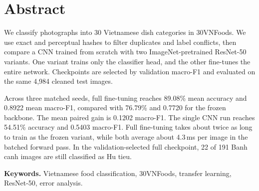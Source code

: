 \section*{Abstract}

We classify photographs into 30 Vietnamese dish categories in 30VNFoods. We use exact and perceptual hashes to filter duplicates and label conflicts, then compare a CNN trained from scratch with two ImageNet-pretrained ResNet-50 variants. One variant trains only the classifier head, and the other fine-tunes the entire network. Checkpoints are selected by validation macro-F1 and evaluated on the same 4,984 cleaned test images.

Across three matched seeds, full fine-tuning reaches 89.08\% mean accuracy and 0.8922 mean macro-F1, compared with 76.79\% and 0.7720 for the frozen backbone. The mean paired gain is 0.1202 macro-F1. The single CNN run reaches 54.51\% accuracy and 0.5403 macro-F1. Full fine-tuning takes about twice as long to train as the frozen variant, while both average about 4.3\,ms per image in the batched forward pass. In the validation-selected full checkpoint, 22 of 191 Banh canh images are still classified as Hu tieu.

\textbf{Keywords.} Vietnamese food classification, 30VNFoods, transfer learning, ResNet-50, error analysis.
